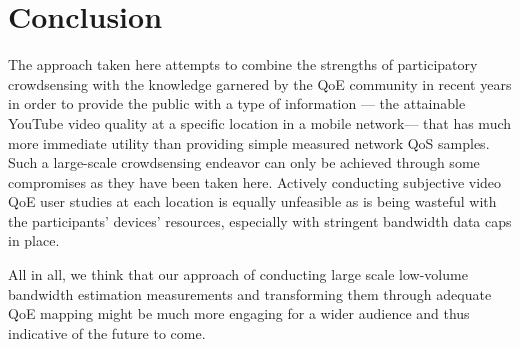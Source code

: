 \section{Conclusion}
\label{sec:conclusion}

The approach taken here attempts to combine the strengths of participatory crowdsensing with the knowledge garnered by the \gls{QoE} community in recent years in order to provide the public with a type of information --- the attainable YouTube video quality at a specific location in a mobile network--- that has much more immediate utility than providing simple measured network \gls{QoS} samples. Such a large-scale crowdsensing endeavor can only be achieved through some compromises as they have been taken here. Actively conducting subjective video \gls{QoE} user studies at each location is equally unfeasible as is being wasteful with the participants' devices' resources, especially with stringent bandwidth data caps in place.

All in all, we think that our approach of conducting large scale low-volume bandwidth estimation measurements and transforming them through adequate \gls{QoE} mapping might be much more engaging for a wider audience and thus indicative of the future to come.